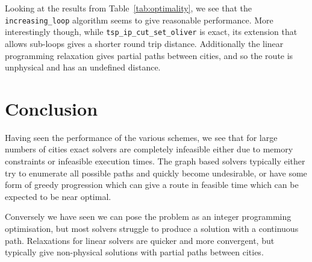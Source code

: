 \documentclass[a4paper, 11pt]{article}
\begin{document}
Looking at the results from Table~\ref{tab:optimality}, we see that the \verb|increasing_loop| algorithm seems to give reasonable performance. More interestingly though, while \verb|tsp_ip_cut_set_oliver| is exact, its extension that allows sub-loops gives a shorter round trip distance. Additionally the linear programming relaxation gives partial paths between cities, and so the route is unphysical and has an undefined distance. 

\section{Conclusion}
\label{sec:conclusion}

Having seen the performance of the various schemes, we see that for large numbers of cities exact solvers are completely infeasible either due to memory constraints or infeasible execution times. The graph based solvers typically either try to enumerate all possible paths and quickly become undesirable, or have some form of greedy progression which can give a route in feasible time which can be expected to be near optimal.

Conversely we have seen we can pose the problem as an integer programming optimisation, but most solvers struggle to produce a solution with a continuous path. Relaxations for linear solvers are quicker and more convergent, but typically give non-physical solutions with partial paths between cities. 

\clearpage

\end{document}
